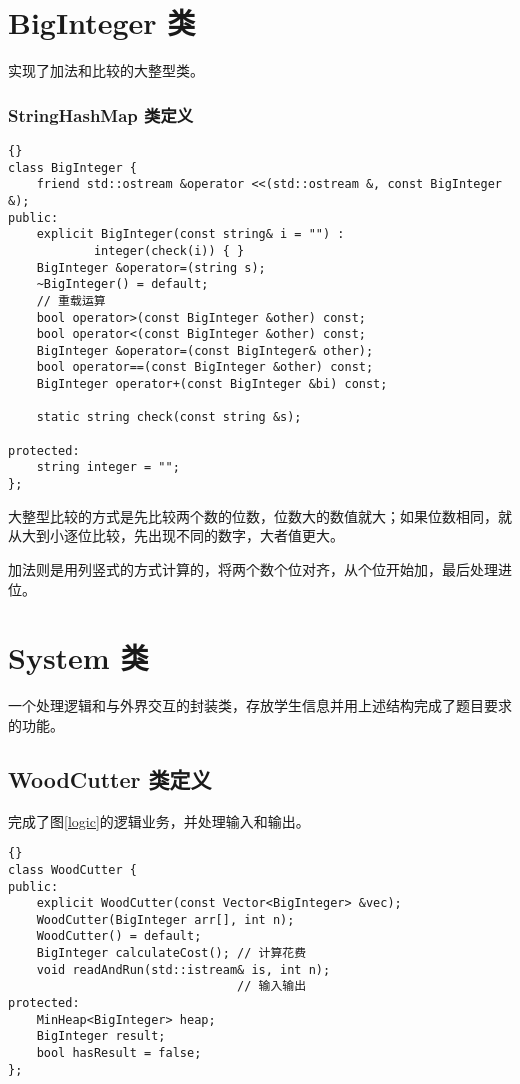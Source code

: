 {\chapter{BigInteger 类}

实现了加法和比较的大整型类。

\subsection{StringHashMap 类定义}
\begin{lstlisting}[firstnumber=386, caption=BigInteger 类定义]{}
class BigInteger {
    friend std::ostream &operator <<(std::ostream &, const BigInteger &);
public:
    explicit BigInteger(const string& i = "") :
            integer(check(i)) { }
    BigInteger &operator=(string s);
    ~BigInteger() = default;
    // 重载运算
    bool operator>(const BigInteger &other) const;
    bool operator<(const BigInteger &other) const;
    BigInteger &operator=(const BigInteger& other);
    bool operator==(const BigInteger &other) const;
    BigInteger operator+(const BigInteger &bi) const;

    static string check(const string &s);

protected:
    string integer = "";
};
\end{lstlisting}

}

大整型比较的方式是先比较两个数的位数，位数大的数值就大；如果位数相同，就从大到小逐位比较，先出现不同的数字，大者值更大。

加法则是用列竖式的方式计算的，将两个数个位对齐，从个位开始加，最后处理进位。


\chapter{System 类}

一个处理逻辑和与外界交互的封装类，存放学生信息并用上述结构完成了题目要求的功能。

\section{WoodCutter 类定义}

完成了图\ref{logic}的逻辑业务，并处理输入和输出。

\begin{lstlisting}[firstnumber=521, caption=System 类定义]{}
class WoodCutter {
public:
    explicit WoodCutter(const Vector<BigInteger> &vec);
    WoodCutter(BigInteger arr[], int n);
    WoodCutter() = default;
    BigInteger calculateCost(); // 计算花费
    void readAndRun(std::istream& is, int n);
                                // 输入输出
protected:
    MinHeap<BigInteger> heap;
    BigInteger result;
    bool hasResult = false;
};
\end{lstlisting}

